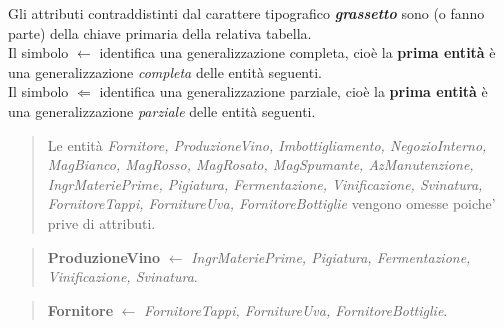 Gli attributi contraddistinti dal carattere tipografico \textbf{\emph{grassetto}} sono (o fanno parte) della chiave primaria della relativa tabella. \\
Il simbolo $\gets$ identifica una generalizzazione completa, cioè la \textbf{prima entità} è una generalizzazione \emph{completa} delle entità seguenti.\\
Il simbolo $\Leftarrow$ identifica una generalizzazione parziale, cioè la \textbf{prima entità} è una generalizzazione \emph{parziale} delle entità seguenti.

\begin{verse}
	Le entità \emph{Fornitore, ProduzioneVino, Imbottigliamento, NegozioInterno, MagBianco, MagRosso, MagRosato, MagSpumante, AzManutenzione, IngrMateriePrime, Pigiatura, Fermentazione, Vinificazione, Svinatura, FornitoreTappi, FornitureUva, FornitoreBottiglie} vengono omesse poiche' prive di attributi.
\end{verse}
\begin{verse}
	\textbf{ProduzioneVino} $\gets$ \emph{IngrMateriePrime, Pigiatura, Fermentazione, Vinificazione, Svinatura}.
\end{verse}
\begin{verse}
	\textbf{Fornitore} $\gets$ \emph{FornitoreTappi, FornitureUva, FornitoreBottiglie}.
\end{verse}

